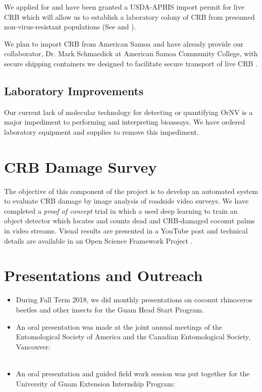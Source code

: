 \documentclass[12pt,letterpaper,english,bibliography=totocnumbered]{scrartcl}
\begin{document}
We applied for and have been granted a USDA-APHIS import permit for live CRB which will allow us to establish a laboratory colony of CRB from presumed non-virus-resistant populations (See \cite{moore_additional_2019} and \cite{usda-aphis_crb_2019}). 

We plan to import CRB from American Samoa and have already provide our collaborator, Dr. Mark Schmaedick at American Samoa Community College, with secure shipping containers we designed to facilitate secure transport of live CRB \cite{moore_container_2017-1}.

\subsection{Laboratory Improvements}

Our current lack of molecular technology for detecting or quantifying OrNV is a major impediment to performing and interpreting bioassays. We have ordered laboratory equipment and supplies to remove this impediment. 


\section{CRB Damage Survey}

The objective of this component of the project is to develop an automated system to evaluate CRB damage by image analysis of roadside video surveys.  We have completed a \textit{proof of concept} trial in which a used deep learning to train an object detector which locates and counts dead and CRB-damaged coconut palms in video streams.  Visual results are presented in a YouTube post \cite{moore_training_2019} and technical details are available in an Open Science Framework Project \cite{moore_open_2019}.

\section{Presentations and Outreach}

\begin{itemize}
	\item During Fall Term 2018, we did monthly presentations on coconut rhinoceros beetles and other insects for the Guam Head Start Program.
	\item An oral presentation was made at the joint annual meetings of the Entomological Society of America and the Canadian Entomological Society, Vancouver: \\\\ 
	\item An oral presentation and guided field work session was put together for the University of Guam Extension Internship Program: \\\\ 	
\end{itemize}
\end{document}
